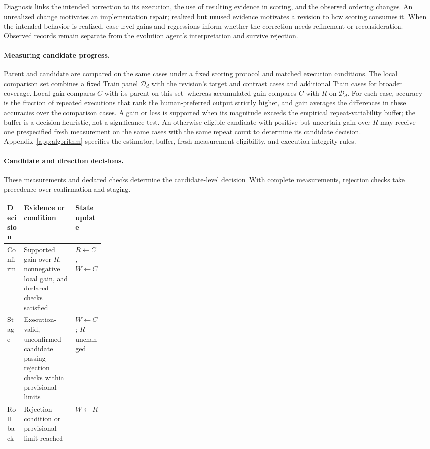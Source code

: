 Diagnosis links the intended correction to its execution, the use of resulting evidence in scoring, and the observed ordering changes.
An unrealized change motivates an implementation repair; realized but unused evidence motivates a revision to how scoring consumes it.
When the intended behavior is realized, case-level gains and regressions inform whether the correction needs refinement or reconsideration.
Observed records remain separate from the evolution agent's interpretation and survive rejection.

\paragraph{Measuring candidate progress.}
Parent and candidate are compared on the same cases under a fixed scoring protocol and matched execution conditions.
The local comparison set combines a fixed Train panel $\mathcal D_d$ with the revision's target and contrast cases and additional Train cases for broader coverage.
Local gain compares $C$ with its parent on this set, whereas accumulated gain compares $C$ with $R$ on $\mathcal D_d$.
For each case, accuracy is the fraction of repeated executions that rank the human-preferred output strictly higher, and gain averages the differences in these accuracies over the comparison cases.
A gain or loss is supported when its magnitude exceeds the empirical repeat-variability buffer; the buffer is a decision heuristic, not a significance test.
An otherwise eligible candidate with positive but uncertain gain over $R$ may receive one prespecified fresh measurement on the same cases with the same repeat count to determine its candidate decision.
Appendix~\ref{app:algorithm} specifies the estimator, buffer, fresh-measurement eligibility, and execution-integrity rules.

\paragraph{Candidate and direction decisions.}
These measurements and declared checks determine the candidate-level decision.
With complete measurements, rejection checks take precedence over confirmation and staging.

\begin{center}
\small
\begin{tabularx}{\linewidth}{@{}lYP{0.23\linewidth}@{}}
\toprule
Decision & Evidence or condition & State update\\
\midrule
Confirm & Supported gain over $R$, nonnegative local gain, and declared checks satisfied & $R\gets C$, $W\gets C$\\
Stage & Execution-valid, unconfirmed candidate passing rejection checks within provisional limits & $W\gets C$; $R$ unchanged\\
Roll back & Rejection condition or provisional limit reached & $W\gets R$\\
\bottomrule
\end{tabularx}
\end{center}

